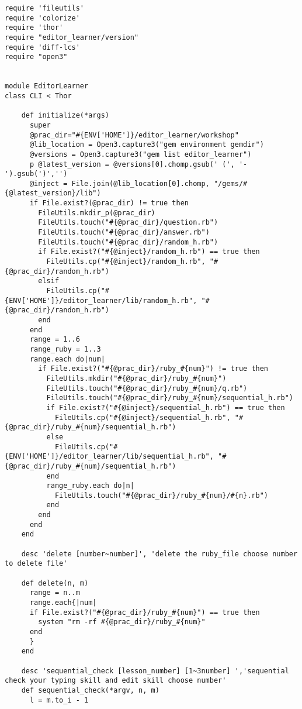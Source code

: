     \begin{verbatim}
require 'fileutils'
require 'colorize'
require 'thor'
require "editor_learner/version"
require 'diff-lcs'
require "open3"


module EditorLearner
class CLI < Thor

    def initialize(*args)
      super
      @prac_dir="#{ENV['HOME']}/editor_learner/workshop"
      @lib_location = Open3.capture3("gem environment gemdir")
      @versions = Open3.capture3("gem list editor_learner")
      p @latest_version = @versions[0].chomp.gsub(' (', '-').gsub(')','')
      @inject = File.join(@lib_location[0].chomp, "/gems/#{@latest_version}/lib")
      if File.exist?(@prac_dir) != true then
        FileUtils.mkdir_p(@prac_dir)
        FileUtils.touch("#{@prac_dir}/question.rb")
        FileUtils.touch("#{@prac_dir}/answer.rb")
        FileUtils.touch("#{@prac_dir}/random_h.rb")
        if File.exist?("#{@inject}/random_h.rb") == true then
          FileUtils.cp("#{@inject}/random_h.rb", "#{@prac_dir}/random_h.rb")
        elsif  
          FileUtils.cp("#{ENV['HOME']}/editor_learner/lib/random_h.rb", "#{@prac_dir}/random_h.rb")
        end
      end
      range = 1..6
      range_ruby = 1..3
      range.each do|num|
        if File.exist?("#{@prac_dir}/ruby_#{num}") != true then
          FileUtils.mkdir("#{@prac_dir}/ruby_#{num}")
          FileUtils.touch("#{@prac_dir}/ruby_#{num}/q.rb")
          FileUtils.touch("#{@prac_dir}/ruby_#{num}/sequential_h.rb")
          if File.exist?("#{@inject}/sequential_h.rb") == true then
            FileUtils.cp("#{@inject}/sequential_h.rb", "#{@prac_dir}/ruby_#{num}/sequential_h.rb")
          else
            FileUtils.cp("#{ENV['HOME']}/editor_learner/lib/sequential_h.rb", "#{@prac_dir}/ruby_#{num}/sequential_h.rb")
          end
          range_ruby.each do|n|
            FileUtils.touch("#{@prac_dir}/ruby_#{num}/#{n}.rb")
          end
        end
      end
    end
    
    desc 'delete [number~number]', 'delete the ruby_file choose number to delete file'
    
    def delete(n, m)
      range = n..m
      range.each{|num|
      if File.exist?("#{@prac_dir}/ruby_#{num}") == true then
        system "rm -rf #{@prac_dir}/ruby_#{num}"
      end
      }
    end

    desc 'sequential_check [lesson_number] [1~3number] ','sequential check your typing skill and edit skill choose number'
    def sequential_check(*argv, n, m)
      l = m.to_i - 1
     

\end{verbatim}
